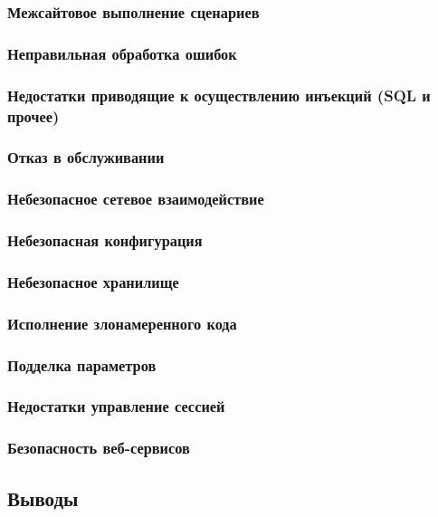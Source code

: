 \documentclass[a4paper, 12pt]{article}		%
\begin{document}
\subsubsection{Межсайтовое выполнение сценариев}

\subsubsection{Неправильная обработка ошибок}

\subsubsection{Недостатки приводящие к осуществлению инъекций (SQL и прочее)}

\subsubsection{Отказ в обслуживании}

\subsubsection{Небезопасное сетевое взаимодействие}

\subsubsection{Небезопасная конфигурация}

\subsubsection{Небезопасное хранилище}

\subsubsection{Исполнение злонамеренного кода}

\subsubsection{Подделка параметров}

\subsubsection{Недостатки управление сессией}

\subsubsection{Безопасность веб-сервисов}

\subsection{Выводы}

\end{document}
